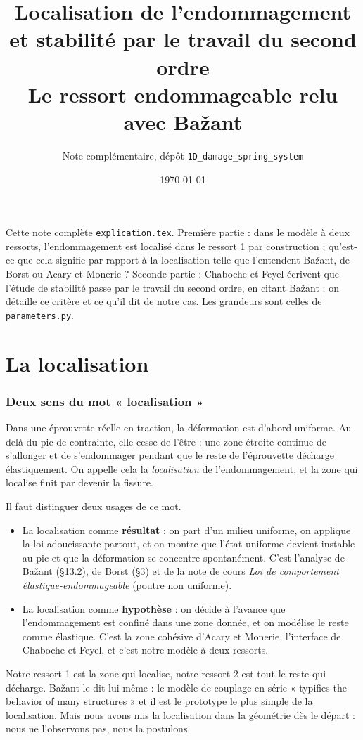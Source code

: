 \documentclass[11pt,a4paper]{article}
\title{Localisation de l'endommagement et stabilité par le travail du second ordre\\
\large Le ressort endommageable relu avec Bažant}
\author{Note complémentaire, dépôt \texttt{1D\_damage\_spring\_system}}
\date{\today}
\begin{document}
\maketitle

\begin{center}
\small Cette note complète \texttt{explication.tex}. Première partie : dans le modèle à deux
ressorts, l'endommagement est localisé dans le ressort 1 par construction ; qu'est-ce que
cela signifie par rapport à la localisation telle que l'entendent Bažant, de Borst ou Acary et
Monerie ? Seconde partie : Chaboche et Feyel écrivent que l'étude de stabilité passe par le
travail du second ordre, en citant Bažant ; on détaille ce critère et ce qu'il dit de notre
cas. Les grandeurs sont celles de \texttt{parameters.py}.
\end{center}

\tableofcontents

\part{La localisation}

\section{Deux sens du mot « localisation »}

Dans une éprouvette réelle en traction, la déformation est d'abord uniforme. Au-delà du pic
de contrainte, elle cesse de l'être : une zone étroite continue de s'allonger et de
s'endommager pendant que le reste de l'éprouvette décharge élastiquement. On appelle cela la
\emph{localisation} de l'endommagement, et la zone qui localise finit par devenir la fissure.

Il faut distinguer deux usages de ce mot.
\begin{itemize}[nosep]
  \item La localisation comme \textbf{résultat} : on part d'un milieu uniforme, on applique la
        loi adoucissante partout, et on montre que l'état uniforme devient instable au pic et
        que la déformation se concentre spontanément. C'est l'analyse de Bažant (§13.2),
        de Borst (§3) et de la note de cours \emph{Loi de comportement élastique-endommageable}
        (poutre non uniforme).
  \item La localisation comme \textbf{hypothèse} : on décide à l'avance que l'endommagement
        est confiné dans une zone donnée, et on modélise le reste comme élastique. C'est la
        zone cohésive d'Acary et Monerie, l'interface de Chaboche et Feyel, et c'est notre
        modèle à deux ressorts.
\end{itemize}
Notre ressort 1 est la zone qui localise, notre ressort 2 est tout le reste qui décharge.
Bažant le dit lui-même : le modèle de couplage en série « typifies the behavior of many
structures » et il est le prototype le plus simple de la localisation. Mais nous avons
mis la localisation dans la géométrie dès le départ : nous ne l'observons pas, nous la
postulons.
\end{document}
